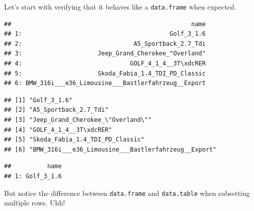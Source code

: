 \documentclass[]{book}
\newenvironment{Shaded}{\begin{snugshade}}{\end{snugshade}}
\newcommand{\DecValTok}[1]{\textcolor[rgb]{0.00,0.00,0.81}{#1}}
\newcommand{\StringTok}[1]{\textcolor[rgb]{0.31,0.60,0.02}{#1}}
\newcommand{\OperatorTok}[1]{\textcolor[rgb]{0.81,0.36,0.00}{\textbf{#1}}}
\newcommand{\NormalTok}[1]{#1}
\theoremstyle{definition}
\theoremstyle{definition}
\theoremstyle{definition}
\theoremstyle{remark}
\begin{document}
Let's start with verifying that it behaves like a \texttt{data.frame}
when expected.

\begin{Shaded}
\end{Shaded}

\begin{verbatim}
##                                                  name
## 1:                                         Golf_3_1.6
## 2:                               A5_Sportback_2.7_Tdi
## 3:                     Jeep_Grand_Cherokee_"Overland"
## 4:                              GOLF_4_1_4__3T\xdcRER
## 5:                     Skoda_Fabia_1.4_TDI_PD_Classic
## 6: BMW_316i___e36_Limousine___Bastlerfahrzeug__Export
\end{verbatim}

\begin{Shaded}
\end{Shaded}

\begin{verbatim}
## [1] "Golf_3_1.6"                                        
## [2] "A5_Sportback_2.7_Tdi"                              
## [3] "Jeep_Grand_Cherokee_\"Overland\""                  
## [4] "GOLF_4_1_4__3T\xdcRER"                             
## [5] "Skoda_Fabia_1.4_TDI_PD_Classic"                    
## [6] "BMW_316i___e36_Limousine___Bastlerfahrzeug__Export"
\end{verbatim}

\begin{Shaded}
\end{Shaded}

\begin{verbatim}
##          name
## 1: Golf_3_1.6
\end{verbatim}

But notice the difference between \texttt{data.frame} and
\texttt{data.table} when subsetting multiple rows. Uhh!
\end{document}
